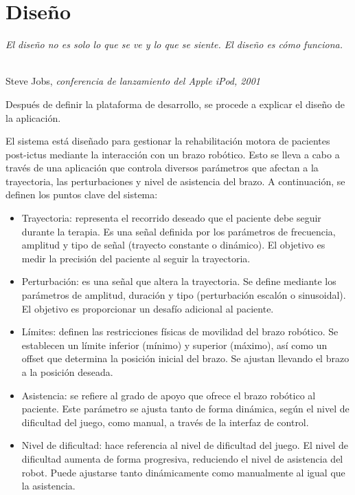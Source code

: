 \chapter{Diseño}
\label{cap:capitulo4}

\begin{flushright}
\begin{minipage}[]{9cm}
\emph{El diseño no es solo lo que se ve y lo que se siente. El diseño es cómo funciona.}\\
\end{minipage}\\

Steve Jobs, \textit{conferencia de lanzamiento del Apple iPod, 2001}\\
\end{flushright}

\vspace{1cm}

Después de definir la plataforma de desarrollo, se procede a explicar el diseño de la aplicación.

El sistema está diseñado para gestionar la rehabilitación motora de pacientes post-ictus mediante la interacción con un brazo robótico.
Esto se lleva a cabo a través de una aplicación que controla diversos parámetros que afectan a la trayectoria, las perturbaciones y nivel de asistencia del brazo.
A continuación, se definen los puntos clave del sistema:
\begin{itemize}
    \item Trayectoria: representa el recorrido deseado que el paciente debe seguir durante la terapia. Es una señal definida por los parámetros de frecuencia, amplitud y tipo de señal (trayecto constante o dinámico). El objetivo es medir la precisión del paciente al seguir la trayectoria.
	\item Perturbación: es una señal que altera la trayectoria. Se define mediante los parámetros de amplitud, duración y tipo (perturbación escalón o sinusoidal). El objetivo es proporcionar un desafío adicional al paciente.
	\item Límites: definen las restricciones físicas de movilidad del brazo robótico. Se establecen un límite inferior (mínimo) y superior (máximo), así como un offset que determina la posición inicial del brazo. Se ajustan llevando el brazo a la posición deseada.
	\item Asistencia: se refiere al grado de apoyo que ofrece el brazo robótico al paciente. Este parámetro se ajusta tanto de forma dinámica, según el nivel de dificultad del juego, como manual, a través de la interfaz de control.
	\item Nivel de dificultad: hace referencia al nivel de dificultad del juego. El nivel de dificultad aumenta de forma progresiva, reduciendo el nivel de asistencia del robot. Puede ajustarse tanto dinámicamente como manualmente al igual que la asistencia.
\end{itemize}\

